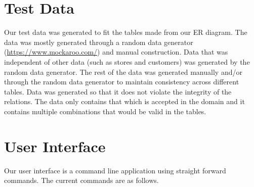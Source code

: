 \documentclass{article}
\begin{document}
	\section{Test Data}
		Our test data was generated to fit the tables made from our ER diagram. The
		data was mostly generated through a random data generator
		(\url{https://www.mockaroo.com/}) and manual construction. Data that was
		independent of other data (such as stores and customers) was generated by
		the random data generator. The rest of the data was generated manually
		and/or through the random data generator to maintain consistency across
		different tables. Data was generated so that it does not violate the
		integrity of the relations. The data only contains that which is accepted
		in the domain and it contains multiple combinations that would be valid
		in the tables.

	\section{User Interface}
    Our user interface is a command line application using straight forward
    commands. The current commands are as follows.
\end{document}
